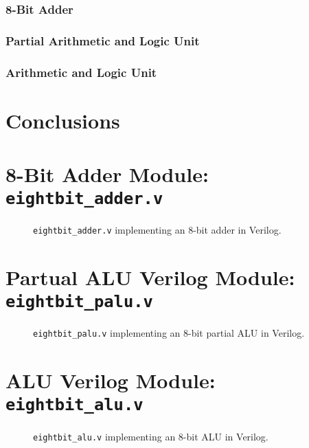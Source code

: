 \documentclass[12pt, letterpaper]{article}
\begin{document}
\subsubsection{8-Bit Adder}

\subsubsection{Partial Arithmetic and Logic Unit}

\subsubsection{Arithmetic and Logic Unit}




\newpage
\section{Conclusions}




\newpage
\appendix
\appendixpage
\addappheadtotoc 


\section{8-Bit Adder Module: \texttt{eightbit\_adder.v}} \label{eightbit_adder_module}
\FloatBarrier
\begin{figure}[h]
	
	\caption{\texttt{eightbit\_adder.v} implementing an 8-bit adder in Verilog.}
\end{figure}
\FloatBarrier


\newpage
\section{Partual ALU Verilog Module: \texttt{eightbit\_palu.v}} \label{eightbit_partial_alu_module}
\FloatBarrier
\begin{figure}[h]
	
	\caption{\texttt{eightbit\_palu.v} implementing an 8-bit partial ALU in Verilog.}
\end{figure}
\FloatBarrier


\newpage
\section{ALU Verilog Module: \texttt{eightbit\_alu.v}} \label{eightbit_alu_module}
\FloatBarrier
\begin{figure}[h]
	
	\caption{\texttt{eightbit\_alu.v} implementing an 8-bit ALU in Verilog.}
\end{figure}
\FloatBarrier
\end{document}
